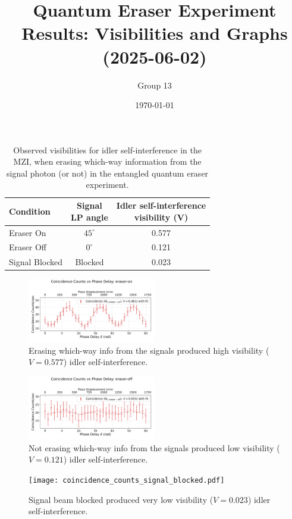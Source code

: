 \documentclass{article}
\title{Quantum Eraser Experiment Results: Visibilities and Graphs (2025-06-02)}
\author{Group 13} %
\date{\today}
\begin{document}
\pagestyle{empty} %

%

\begin{table}[h!]
\centering
\begin{tabular}{lcc}
\toprule
Condition & \makecell{Signal \\ LP angle} & \makecell{Idler self-interference \\ visibility (V)} \\
\midrule
Eraser On          & $45^\circ$  & 0.577 \\
Eraser Off         & $0^\circ$ & 0.121 \\
Signal Blocked     & Blocked & 0.023 \\
\bottomrule
\end{tabular}
\caption{
  Observed visibilities for idler self-interference in the MZI,
  when erasing which-way information from the signal photon (or not)
  in the entangled quantum eraser experiment.}
\end{table}

\begin{figure}[h!]
\centering
\includegraphics[width=0.5\textwidth]{coincidence_counts_eraser_on.pdf}
\caption*{
  Erasing which-way info from the signals
  produced high visibility ($V=0.577$) idler self-interference.
}
\end{figure}

\begin{figure}[h!]
\centering
\includegraphics[width=0.5\textwidth]{coincidence_counts_eraser_off.pdf}
\caption*{
  Not erasing which-way info from the signals
  produced low visibility ($V=0.121$) idler self-interference.
}
\end{figure}

\begin{figure}[h!]
\centering
\texttt{[image: coincidence\_counts\_signal\_blocked.pdf]}
\caption*{
  Signal beam blocked
  produced very low visibility ($V=0.023$) idler self-interference.
}
\end{figure}
\end{document}
